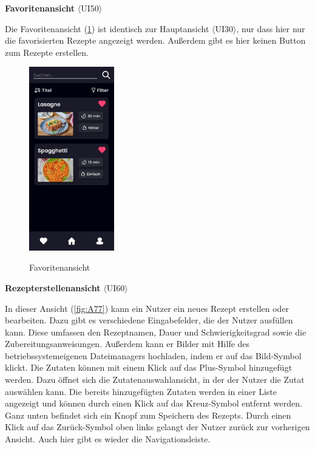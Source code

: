 \documentclass[parskip=full]{scrartcl}
\begin{document}
\textbf{Favoritenansicht} $\langle$UI50$\rangle$

Die Favoritenansicht (\ref{fig:A76}) ist identisch zur Hauptansicht $\langle$UI30$\rangle$, nur dass hier nur die favorisierten Rezepte angezeigt werden. Außerdem gibt es hier keinen Button zum Rezepte erstellen.
\newpage
\begin{figure}[!htp]
    \centering
    \includegraphics[height=80mm]{images/section7/FavouritesView.jpg}
    \label{fig:A76}
    \caption{Favoritenansicht}
\end{figure}

\textbf{Rezepterstellenansicht} $\langle$UI60$\rangle$

In dieser Ansicht (\ref{fig:A77}) kann ein Nutzer ein neues Rezept erstellen oder bearbeiten. Dazu gibt es verschiedene Eingabefelder, die der Nutzer ausfüllen kann. Diese umfassen den Rezeptnamen, Dauer und Schwierigkeitsgrad sowie die Zubereitungsanweisungen. Außerdem kann er Bilder mit Hilfe des betriebssystemeigenen Dateimanagers hochladen, indem er auf das Bild-Symbol klickt. 
Die Zutaten können mit einem Klick auf das Plus-Symbol hinzugefügt werden. Dazu öffnet sich die Zutatenauswahlansicht, in der der Nutzer die Zutat auswählen kann. Die bereits hinzugefügten Zutaten werden in einer Liste angezeigt und können durch einen Klick auf das Kreuz-Symbol entfernt werden. Ganz unten befindet sich ein Knopf zum Speichern des Rezepts. Durch einen Klick auf das Zurück-Symbol oben links gelangt der Nutzer zurück zur vorherigen Ansicht. Auch hier gibt es wieder die Navigationsleiste.
\end{document}
